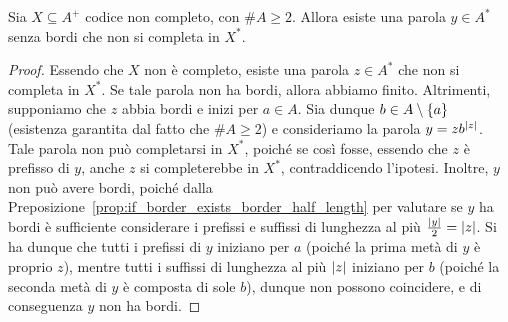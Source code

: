 \begin{lemma}[label=lem:code_not_complete_boredless_word]{}
  Sia \(X \subseteq A^+\) codice non completo, con \(\# A \geq 2\).
  Allora esiste una parola \(y \in A^*\) senza bordi che non si completa in \(X^*\).
\end{lemma}
\begin{proof}
  Essendo che \(X\) non è completo, esiste una parola \(z \in A^*\) che non si completa in \(X^*\).
  Se tale parola non ha bordi, allora abbiamo finito.
  Altrimenti, supponiamo che \(z\) abbia bordi e inizi per \(a \in A\).
  Sia dunque \(b \in A\setminus\set{a}\) (esistenza garantita dal fatto che \(\# A \geq 2\)) e consideriamo la parola \(y = zb^{\left|z\right|}\).
  Tale parola non può completarsi in \(X^*\), poiché se così fosse, essendo che \(z\) è prefisso di \(y\), anche \(z\) si completerebbe in \(X^*\), contraddicendo l'ipotesi.
  Inoltre, \(y\) non può avere bordi, poiché dalla Preposizione~\ref{prop:if_border_exists_border_half_length} per valutare se \(y\) ha bordi è sufficiente considerare i prefissi e suffissi di lunghezza al più \(\frac{\left|y\right|}{2} = \left|z\right|\).
  Si ha dunque che tutti i prefissi di \(y\) iniziano per \(a\) (poiché la prima metà di \(y\) è proprio \(z\)), mentre tutti i suffissi di lunghezza al più \(\left|z\right|\) iniziano per \(b\) (poiché la seconda metà di \(y\) è composta di sole \(b\)), dunque non possono coincidere, e di conseguenza \(y\) non ha bordi.
\end{proof}

